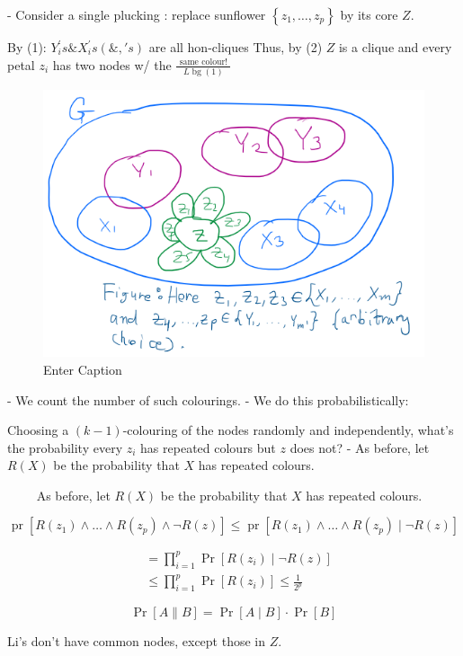  - Consider a single plucking : replace sunflower $\left\{z_1, \ldots, z_p\right\}$ by its core $Z$.

By (1): $Y_i^{\prime} s \& X_i^{\prime} s(\&, ' s)$
are all hon-cliques
Thus, by (2)
$Z$ is a clique
and every petal $z_i$
has two nodes w/ the $\frac{\text { same colour! }}{L \operatorname{bg}(1)}$



\begin{figure}[H]
    \centering
    \includegraphics[width=.6\linewidth]{images/clique3.png}
    \caption{Enter Caption}
    \label{fig:enter-label}
\end{figure}


- We count the number of such colourings.
- We do this probabilistically:

Choosing a $(k-1)$-colouring of the nodes randomly and independently, what's the probability every $z_i$ has repeated colours but $z$ does not?
- As before, let $R(X)$ be the probability that $X$ has repeated colours.


$\qquad$ As before, let $R(X)$ be the probability that $X$ has repeated colours.

$$
\operatorname{pr}\left[R\left(z_1\right) \wedge \ldots \wedge R\left(z_p\right) \wedge \neg R(z)\right] \leqslant \operatorname{pr}\left[R\left(z_1\right) \wedge \ldots \wedge R\left(z_p\right) \mid \neg R(z)\right]$$

$$
\begin{aligned}
& =\prod_{i=1}^p \operatorname{Pr}\left[R\left(z_i\right) \mid \neg R(z)\right] \\
& \leqslant \prod_{i=1}^p \operatorname{Pr}\left[R\left(z_i\right)\right]
\leqslant \frac{1}{2^p}
\end{aligned}
$$

$$
\operatorname{Pr}[A \| B]=\operatorname{Pr}[A \mid B] \cdot \operatorname{Pr}[B]
$$


Li's don't have common nodes, except those in $Z$.

